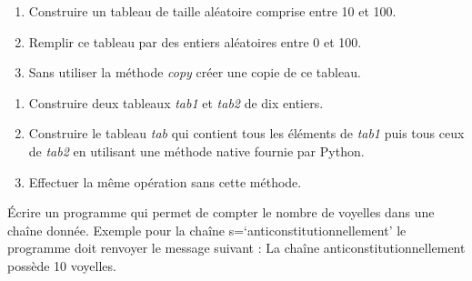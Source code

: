 \documentclass[a4paper,11pt]{article}
\begin{document}
\begin{Form}
\begin{exo}
\end{exo}
\begin{exo}
\begin{enumerate}
\item Construire un tableau de taille aléatoire comprise entre 10 et 100.
\item Remplir ce tableau par des entiers aléatoires entre 0 et 100.
\item Sans utiliser la méthode \emph{copy} créer une copie de ce tableau.
\end{enumerate}
\end{exo}
\begin{exo}
\begin{enumerate}
\item Construire deux tableaux \emph{tab1} et \emph{tab2} de dix entiers.
\item Construire le tableau \emph{tab} qui contient tous les éléments de \emph{tab1} puis tous ceux de \emph{tab2} en utilisant une méthode native fournie par Python.
\item Effectuer la même opération sans cette méthode.
\end{enumerate} 
\end{exo}
\begin{exo}
Écrire un programme qui permet de compter le nombre de voyelles dans une chaîne donnée. Exemple pour la chaîne s=‘anticonstitutionnellement’ le programme doit renvoyer le message suivant : La chaîne anticonstitutionnellement possède 10 voyelles.
\end{exo}
\end{Form}
\end{document}
